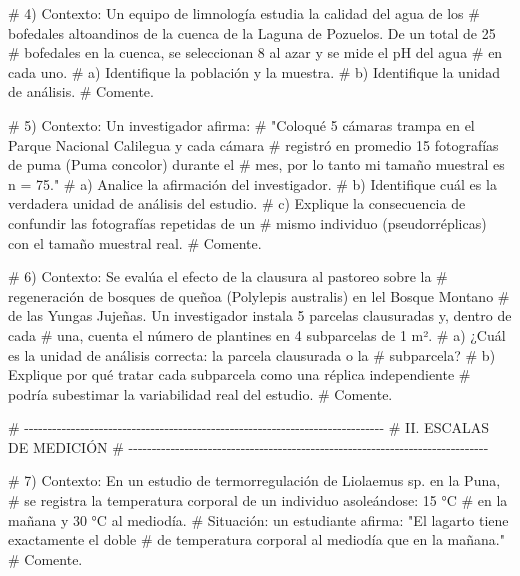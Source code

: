 \documentclass[
  spanish,
  letterpaper,
  DIV=11,
  numbers=noendperiod]{scrreprt}
\newenvironment{Shaded}{\begin{snugshade}}{\end{snugshade}}
\newcommand{\CommentTok}[1]{\textcolor[rgb]{0.37,0.37,0.37}{#1}}
\begin{document}
\begin{Shaded}
\begin{Highlighting}[]
\CommentTok{\# 4) Contexto: Un equipo de limnología estudia la calidad del agua de los}
\CommentTok{\#    bofedales altoandinos de la cuenca de la Laguna de Pozuelos. De un total de 25}
\CommentTok{\#    bofedales en la cuenca, se seleccionan 8 al azar y se mide el pH del agua}
\CommentTok{\#    en cada uno.}
\CommentTok{\#    a) Identifique la población y la muestra.}
\CommentTok{\#    b) Identifique la unidad de análisis.}
\CommentTok{\#    Comente.}


\CommentTok{\# 5) Contexto: Un investigador afirma:}
\CommentTok{\#    "Coloqué 5 cámaras trampa en el Parque Nacional Calilegua y cada cámara}
\CommentTok{\#    registró en promedio 15 fotografías de puma (Puma concolor) durante el}
\CommentTok{\#    mes, por lo tanto mi tamaño muestral es n = 75."}
\CommentTok{\#    a) Analice la afirmación del investigador.}
\CommentTok{\#    b) Identifique cuál es la verdadera unidad de análisis del estudio.}
\CommentTok{\#    c) Explique la consecuencia de confundir las fotografías repetidas de un}
\CommentTok{\#       mismo individuo (pseudorréplicas) con el tamaño muestral real.}
\CommentTok{\#    Comente.}


\CommentTok{\# 6) Contexto: Se evalúa el efecto de la clausura al pastoreo sobre la}
\CommentTok{\#    regeneración de bosques de queñoa (Polylepis australis) en lel Bosque Montano}
\CommentTok{\#    de las Yungas Jujeñas. Un investigador instala 5 parcelas clausuradas y, dentro de cada}
\CommentTok{\#    una, cuenta el número de plantines en 4 subparcelas de 1 m².}
\CommentTok{\#    a) ¿Cuál es la unidad de análisis correcta: la parcela clausurada o la}
\CommentTok{\#       subparcela?}
\CommentTok{\#    b) Explique por qué tratar cada subparcela como una réplica independiente}
\CommentTok{\#       podría subestimar la variabilidad real del estudio.}
\CommentTok{\#    Comente.}


\CommentTok{\# {-}{-}{-}{-}{-}{-}{-}{-}{-}{-}{-}{-}{-}{-}{-}{-}{-}{-}{-}{-}{-}{-}{-}{-}{-}{-}{-}{-}{-}{-}{-}{-}{-}{-}{-}{-}{-}{-}{-}{-}{-}{-}{-}{-}{-}{-}{-}{-}{-}{-}{-}{-}{-}{-}{-}{-}{-}{-}{-}{-}{-}{-}{-}{-}{-}{-}{-}{-}{-}{-}{-}{-}{-}{-}{-}{-}{-}}
\CommentTok{\# II. ESCALAS DE MEDICIÓN}
\CommentTok{\# {-}{-}{-}{-}{-}{-}{-}{-}{-}{-}{-}{-}{-}{-}{-}{-}{-}{-}{-}{-}{-}{-}{-}{-}{-}{-}{-}{-}{-}{-}{-}{-}{-}{-}{-}{-}{-}{-}{-}{-}{-}{-}{-}{-}{-}{-}{-}{-}{-}{-}{-}{-}{-}{-}{-}{-}{-}{-}{-}{-}{-}{-}{-}{-}{-}{-}{-}{-}{-}{-}{-}{-}{-}{-}{-}{-}{-}}

\CommentTok{\# 7) Contexto: En un estudio de termorregulación de Liolaemus sp. en la Puna,}
\CommentTok{\#    se registra la temperatura corporal de un individuo asoleándose: 15 °C}
\CommentTok{\#    en la mañana y 30 °C al mediodía.}
\CommentTok{\#    Situación: un estudiante afirma: "El lagarto tiene exactamente el doble}
\CommentTok{\#    de temperatura corporal al mediodía que en la mañana."}
\CommentTok{\#    Comente.}



\end{Highlighting}
\end{Shaded}
\end{document}

